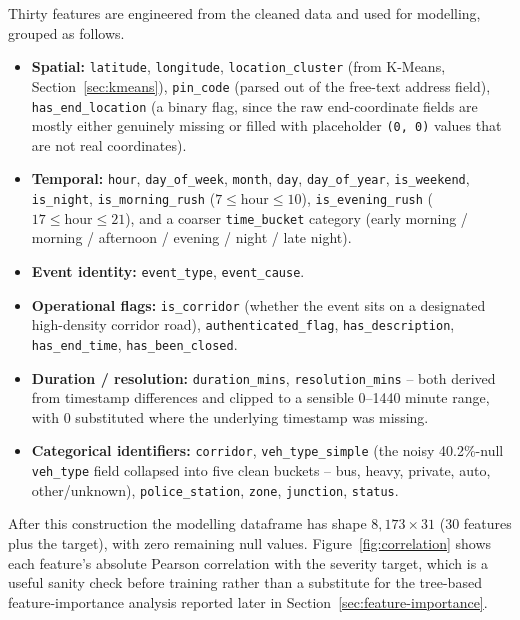 Thirty features are engineered from the cleaned data and used for modelling, grouped as follows.

\begin{itemize}
\item \textbf{Spatial:} \texttt{latitude}, \texttt{longitude}, \texttt{location\_cluster} (from K-Means, Section~\ref{sec:kmeans}), \texttt{pin\_code} (parsed out of the free-text address field), \texttt{has\_end\_location} (a binary flag, since the raw end-coordinate fields are mostly either genuinely missing or filled with placeholder \texttt{(0, 0)} values that are not real coordinates).
\item \textbf{Temporal:} \texttt{hour}, \texttt{day\_of\_week}, \texttt{month}, \texttt{day}, \texttt{day\_of\_year}, \texttt{is\_weekend}, \texttt{is\_night}, \texttt{is\_morning\_rush} ($7 \le \text{hour} \le 10$), \texttt{is\_evening\_rush} ($17 \le \text{hour} \le 21$), and a coarser \texttt{time\_bucket} category (early morning / morning / afternoon / evening / night / late night).
\item \textbf{Event identity:} \texttt{event\_type}, \texttt{event\_cause}.
\item \textbf{Operational flags:} \texttt{is\_corridor} (whether the event sits on a designated high-density corridor road), \texttt{authenticated\_flag}, \texttt{has\_description}, \texttt{has\_end\_time}, \texttt{has\_been\_closed}.
\item \textbf{Duration / resolution:} \texttt{duration\_mins}, \texttt{resolution\_mins} -- both derived from timestamp differences and clipped to a sensible 0--1440 minute range, with 0 substituted where the underlying timestamp was missing.
\item \textbf{Categorical identifiers:} \texttt{corridor}, \texttt{veh\_type\_simple} (the noisy 40.2\%-null \texttt{veh\_type} field collapsed into five clean buckets -- bus, heavy, private, auto, other/unknown), \texttt{police\_station}, \texttt{zone}, \texttt{junction}, \texttt{status}.
\end{itemize}

After this construction the modelling dataframe has shape $8{,}173 \times 31$ (30 features plus the target), with zero remaining null values. Figure~\ref{fig:correlation} shows each feature's absolute Pearson correlation with the severity target, which is a useful sanity check before training rather than a substitute for the tree-based feature-importance analysis reported later in Section~\ref{sec:feature-importance}.

